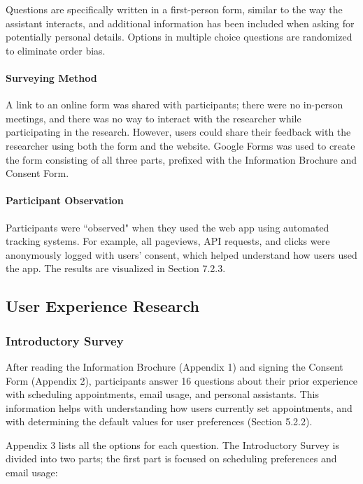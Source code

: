 \documentclass{article}
\begin{document}
Questions are specifically written in a first-person form, similar to the way the assistant interacts, and additional information has been included when asking for potentially personal details. Options in multiple choice questions are randomized to eliminate order bias.

\paragraph{Surveying Method}

A link to an online form was shared with participants; there were no in-person meetings, and there was no way to interact with the researcher while participating in the research. However, users could share their feedback with the researcher using both the form and the website. Google Forms was used to create the form consisting of all three parts, prefixed with the Information Brochure and Consent Form.

\paragraph{Participant Observation}

Participants were ``observed" when they used the web app using automated tracking systems. For example, all pageviews, API requests, and clicks were anonymously logged with users' consent, which helped understand how users used the app. The results are visualized in Section 7.2.3.

\subsection{User Experience Research}

\subsubsection{Introductory Survey}

After reading the Information Brochure (Appendix 1) and signing the Consent Form (Appendix 2), participants answer 16 questions about their prior experience with scheduling appointments, email usage, and personal assistants. This information helps with understanding how users currently set appointments, and with determining the default values for user preferences (Section 5.2.2).

Appendix 3 lists all the options for each question. The Introductory Survey is divided into two parts; the first part is focused on scheduling preferences and email usage:
\end{document}
